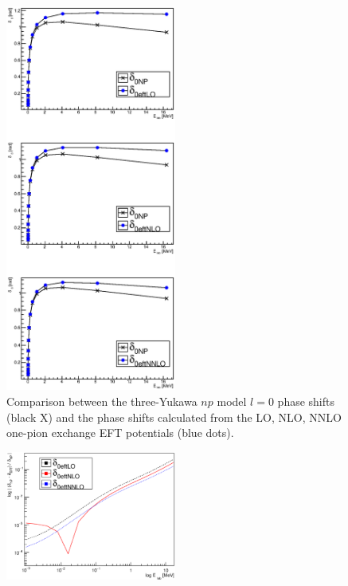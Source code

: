 \documentclass[10pt,showpacs,preprintnumbers,footinbib,amsmath,amssymb,aps,prl,twocolumn,groupedaddress,superscriptaddress,showkeys]{revtex4-1}
\begin{document}

\begin{figure}
\centering
	\includegraphics[width=0.5\textwidth]{figures/phy989_OnePion.eps}
	\caption{Comparison between the three-Yukawa $np$ model $l=0$ phase shifts
	(black X)
	and the phase shifts calculated from the LO, NLO, NNLO one-pion exchange
	EFT potentials (blue dots).}
	\label{fig:OnePion}
\end{figure}

\begin{figure}
\centering
	\includegraphics[width=0.5\textwidth]{figures/phy989_OnePionLepage.eps}
	\caption{}
	\label{fig:OnePionLepage}
\end{figure}
\end{document}

